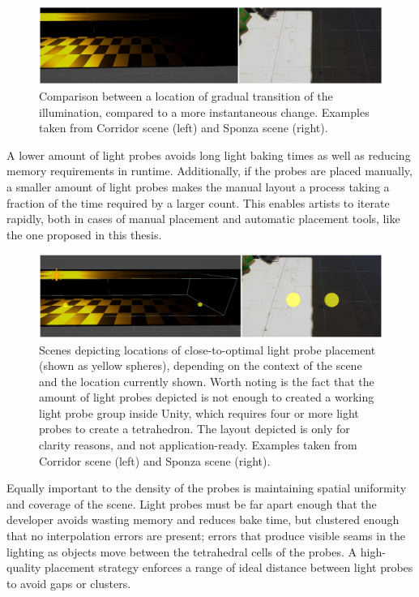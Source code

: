 \begin{figure}[h]
	\centering
	\includegraphics[width=\linewidth]{Graphics/results/concats/comparison7.png}
	\caption{Comparison between a location of gradual transition of the illumination, compared to a more instantaneous change. Examples taken from Corridor scene (left) and Sponza scene (right).}
	\label{fig:transition_comparison}
\end{figure}

A lower amount of light probes avoids long light baking times as well as reducing memory requirements in runtime. Additionally, if the probes are placed manually, a smaller amount of light probes makes the manual layout a process taking a fraction of the time required by a larger count. This enables artists to iterate rapidly, both in cases of manual placement and automatic placement tools, like the one proposed in this thesis.

\begin{figure}[h]
	\centering
	\includegraphics[width=\linewidth]{Graphics/results/concats/comparison8.png}
	\caption{Scenes depicting locations of close-to-optimal light probe placement (shown as yellow spheres), depending on the context of the scene and the location currently shown. Worth noting is the fact that the amount of light probes depicted is not enough to created a working light probe group inside Unity, which requires four or more light probes to create a tetrahedron. The layout depicted is only for clarity reasons, and not application-ready. Examples taken from Corridor scene (left) and Sponza scene (right).}
	\label{fig:transition_comparison_lp}
\end{figure}

Equally important to the density of the probes is maintaining spatial uniformity and coverage of the scene. Light probes must be far apart enough that the developer avoids wasting memory and reduces bake time, but clustered enough that no interpolation errors are present; errors that produce visible seams in the lighting as objects move between the tetrahedral cells of the probes. A high-quality placement strategy enforces a range of ideal distance between light probes to avoid gaps or clusters.

